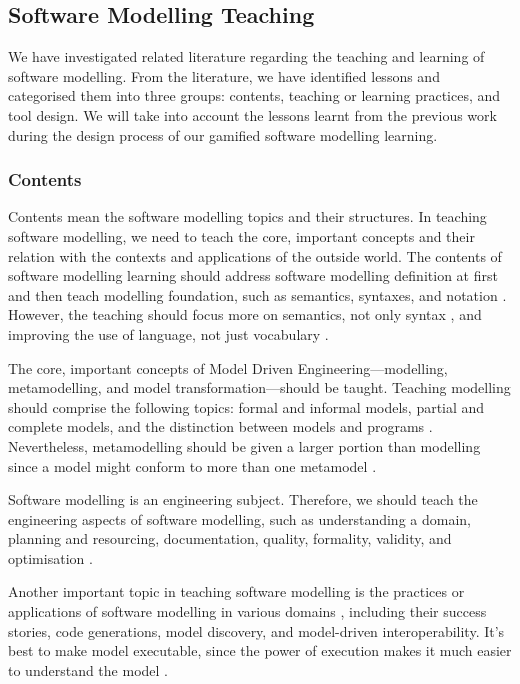 \documentclass[12pt, a4paper]{report}
\begin{document}
{\subsection{Software Modelling Teaching}
\label{Software Modelling Teaching}
We have investigated related literature regarding the teaching and learning of software modelling. From the literature, we have identified lessons and categorised them into three groups: contents, teaching or learning practices, and tool design. We will take into account the lessons learnt from the previous work during the design process of our gamified software modelling learning. 

\subsubsection{Contents}
Contents mean the software modelling topics and their structures. In teaching software modelling, we need to teach the core, important concepts and their relation with the contexts and applications of the outside world. The contents of software modelling learning should address software modelling definition at first \cite{borstler2012teaching} and then teach modelling foundation, such as semantics, syntaxes, and notation \cite{borstler2012teaching}. However, the teaching should focus more on semantics, not only syntax \cite{borstler2012teaching}, and improving the use of language, not just vocabulary \cite{bezivin2009teaching}. 

The core, important concepts of Model Driven Engineering---modelling, metamodelling, and model transformation---should be taught. Teaching modelling should comprise the following topics: formal and informal models, partial and complete models, and the distinction between models and programs \cite{bezivin2009teaching}. Nevertheless, metamodelling should be given a larger portion than modelling since a model might conform to more than one metamodel \cite{ober2007teaching}. 

Software modelling is an engineering subject. Therefore, we should teach the engineering aspects of software modelling, such as  understanding a domain, planning and resourcing, documentation, quality, formality, validity, and optimisation \cite{paige2014bad}.

Another important topic in teaching software modelling is the practices or applications of software modelling in various domains \cite{ borstler2012teaching, paige2014bad}, including their success stories, code generations, model discovery, and model-driven interoperability. It's best to make model executable, since the power of execution makes it much easier to understand the model \cite{bezivin2009teaching}.

}
\end{document}
